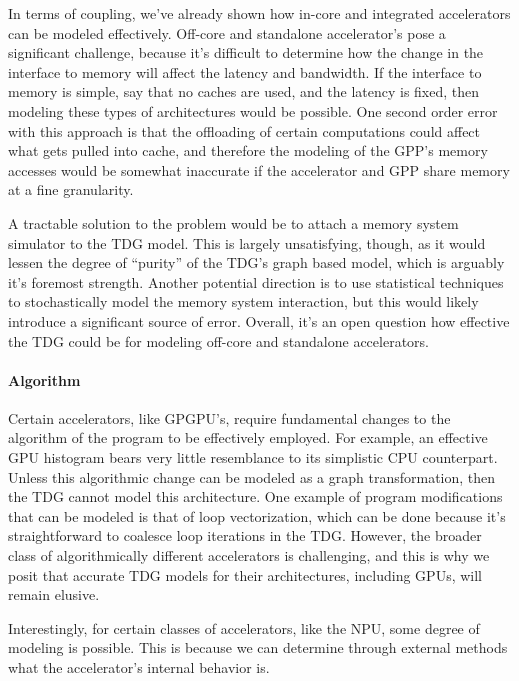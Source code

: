 In terms of coupling, we've already shown how in-core and integrated accelerators can
be modeled effectively.  Off-core and standalone accelerator's pose a
significant challenge, because it's difficult to determine how the change in
the interface to memory will affect the latency and bandwidth.  If the
interface to memory is simple, say that no caches are used, and the latency
is fixed, then modeling these types of architectures would be possible.
One second order error with this approach is that the offloading of certain computations
could affect what gets pulled into cache, and therefore the modeling of the GPP's
memory accesses would be somewhat inaccurate if the accelerator and GPP share
memory at a fine granularity. 

A tractable solution to the problem would be to attach a memory
system simulator to the TDG model.  This is largely unsatisfying, though, as it
would lessen the degree of ``purity'' of the TDG's graph based model, which is
arguably it's foremost strength.  Another potential direction is to use
statistical techniques to stochastically model the memory system interaction,
but this would likely introduce a significant source of error.  Overall, it's
an open question how effective the TDG could be for modeling off-core and standalone
accelerators.

\paragraph{Algorithm}
Certain accelerators, like GPGPU's, require fundamental changes to the
algorithm of the program to be effectively employed.  For example, an effective
GPU histogram bears very little resemblance to its simplistic CPU counterpart.
Unless this algorithmic change can be modeled as a graph transformation, then
the TDG cannot model this architecture.  One example of program modifications
that can be modeled is that of loop vectorization, which can be done because
it's straightforward to coalesce loop iterations in the TDG.  However, the
broader class of algorithmically different accelerators is challenging, and
this is why we posit that accurate TDG models for their architectures,
including GPUs, will remain elusive.

Interestingly, for certain classes of accelerators, like the NPU, some degree of
modeling is possible.  This is because we can determine through external methods
what the accelerator's internal behavior is.

